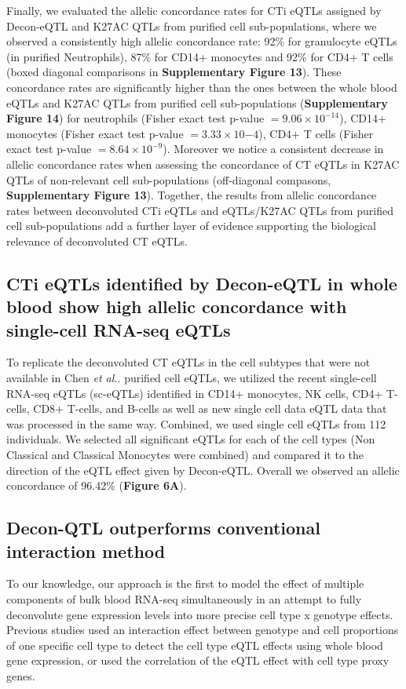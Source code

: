 Finally, we evaluated the allelic concordance rates for CTi eQTLs assigned by Decon-eQTL and K27AC QTLs from purified cell sub-populations, where we observed a consistently high allelic concordance rate: 92\% for granulocyte eQTLs (in purified Neutrophils), 87\% for CD14+ monocytes and 92\% for CD4+ T cells (boxed diagonal comparisons in \textbf{Supplementary Figure 13}). These concordance rates are significantly higher than the ones between the whole blood eQTLs and K27AC QTLs from purified cell sub-populations (\textbf{Supplementary Figure 14}) for neutrophils (Fisher exact test p-value $= 9.06 \times 10^{-14}$), CD14+ monocytes (Fisher exact test p-value $= 3.33 \times 10{-4}$), CD4+ T cells (Fisher exact test p-value $= 8.64 \times 10^{-9}$). Moreover we notice a consistent decrease in allelic concordance rates when assessing the concordance of CT eQTLs in K27AC QTLs of non-relevant cell sub-populations (off-diagonal compasons, \textbf{Supplementary Figure 13}). Together, the results from allelic concordance rates between deconvoluted CTi eQTLs and eQTLs/K27AC QTLs from purified cell sub-populations add a further layer of evidence supporting the biological relevance of deconvoluted CT eQTLs.

\subsection{CTi eQTLs identified by Decon-eQTL in whole blood show high allelic concordance with single-cell RNA-seq eQTLs}
To replicate the deconvoluted CT eQTLs in the cell subtypes that were not available in Chen \emph{et al.}\cite{chenGeneticDriversEpigenetic2016}. purified cell eQTLs, we utilized the recent single-cell RNA-seq eQTLs (sc-eQTLs) identified in CD14+ monocytes, NK cells, CD4+ T-cells, CD8+ T-cells, and B-cells\cite{wijstSinglecellRNASequencing2018} as well as new single cell data eQTL data that was processed in the same way. Combined, we used single cell eQTLs from 112 individuals. We selected all significant eQTLs for each of the cell types (Non Classical and Classical Monocytes were combined) and compared it to the direction of the eQTL effect given by Decon-eQTL. Overall we observed an allelic concordance of 96.42\% (\textbf{Figure 6A}).

\subsection{Decon-QTL outperforms conventional interaction method}
To our knowledge, our approach is the first to model the effect of multiple components of bulk blood RNA-seq simultaneously in an attempt to fully deconvolute gene expression levels into more precise cell type x genotype effects. Previous studies used an interaction effect between genotype and cell proportions of one specific cell type to detect the cell type eQTL effects using whole blood gene expression\cite{westraCellSpecificEQTL2015}, or used the correlation of the eQTL effect with cell type proxy genes\cite{zhernakovaIdentificationContextdependentExpression2017a}. 

